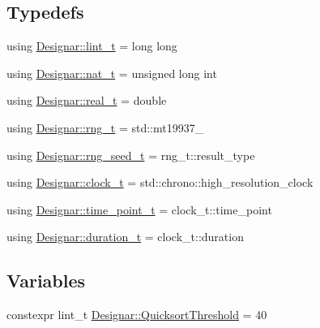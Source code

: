 \subsection*{Typedefs}
\begin{DoxyCompactItemize}
\item 
using \hyperlink{namespace_designar_a9d113d66a39e82b73727c72cd3a52f73}{Designar\+::lint\+\_\+t} = long long
\item 
using \hyperlink{namespace_designar_aa72662848b9f4815e7bf31a7cf3e33d1}{Designar\+::nat\+\_\+t} = unsigned long int
\item 
using \hyperlink{namespace_designar_aca2c32af26808dbec1f3a3071fad25ce}{Designar\+::real\+\_\+t} = double
\item 
using \hyperlink{namespace_designar_a9ca84e2ff5daa62ebc4dab52f3a6c855}{Designar\+::rng\+\_\+t} = std\+::mt19937\+\_
\item 
using \hyperlink{namespace_designar_ad621b5646d45288c5d6a1e1dfe7531a8}{Designar\+::rng\+\_\+seed\+\_\+t} = rng\+\_\+t\+::result\+\_\+type
\item 
using \hyperlink{namespace_designar_a4892484bd553fb9ec4b8a559a83a415c}{Designar\+::clock\+\_\+t} = std\+::chrono\+::high\+\_\+resolution\+\_\+clock
\item 
using \hyperlink{namespace_designar_a0edbd598eadb672df2c70e5af4dfccee}{Designar\+::time\+\_\+point\+\_\+t} = clock\+\_\+t\+::time\+\_\+point
\item 
using \hyperlink{namespace_designar_a585b685c3d4f0d52edf0a6412caee626}{Designar\+::duration\+\_\+t} = clock\+\_\+t\+::duration
\end{DoxyCompactItemize}
\subsection*{Variables}
\begin{DoxyCompactItemize}
\item 
constexpr lint\+\_\+t \hyperlink{namespace_designar_a62c201985e06bb7419a888d5d2b7bde8}{Designar\+::\+Quicksort\+Threshold} = 40
\end{DoxyCompactItemize}
